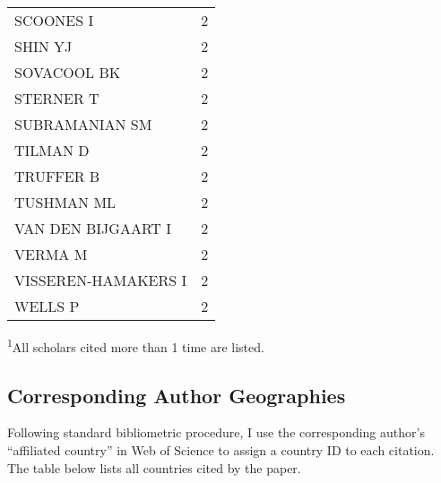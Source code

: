 \documentclass[]{article}
\begin{document}
\begin{longtable}{lc}
SCOONES I & 2 \\ 
SHIN YJ & 2 \\ 
SOVACOOL BK & 2 \\ 
STERNER T & 2 \\ 
SUBRAMANIAN SM & 2 \\ 
TILMAN D & 2 \\ 
TRUFFER B & 2 \\ 
TUSHMAN ML & 2 \\ 
VAN DEN BIJGAART I & 2 \\ 
VERMA M & 2 \\ 
VISSEREN-HAMAKERS I & 2 \\ 
WELLS P & 2 \\ 
\bottomrule
\end{longtable}
\vspace{-5mm}
\begin{minipage}{\linewidth}
\textsuperscript{1}All scholars cited more than 1 time are listed. \\ 
\end{minipage}

\hypertarget{corresponding-author-geographies}{%
\subsection{Corresponding Author
Geographies}\label{corresponding-author-geographies}}

Following standard bibliometric procedure, I use the corresponding
author's ``affiliated country'' in Web of Science to assign a country ID
to each citation. The table below lists all countries cited by the
paper. \captionsetup[table]{labelformat=empty,skip=1pt}
\end{document}
